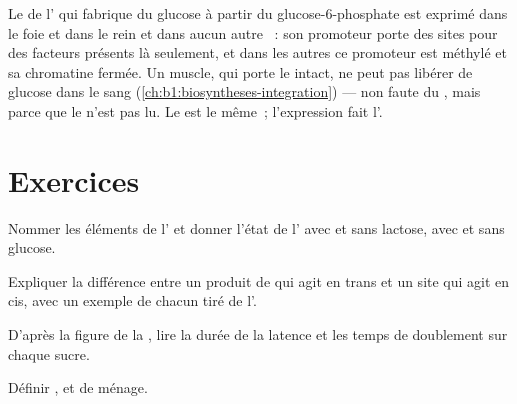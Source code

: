 \begin{example}\label{ex:b1:expression-control:twoorgans}
Le  de l' qui fabrique du glucose à partir du
glucose-6-phosphate est exprimé dans le foie et dans le rein et dans
aucun autre ~: son promoteur porte des sites pour des facteurs
présents là seulement, et dans les autres  ce promoteur est
méthylé et sa chromatine fermée. Un muscle, qui porte le  intact, ne
peut pas libérer de glucose dans le sang
(\cref{ch:b1:biosyntheses-integration}) --- non faute du , mais
parce que le  n'est pas lu. Le  est le même~; l'expression
fait l'.
\end{example}

\section{Exercices}

\begin{exercise}[$\star$]\label{exo:b1:expression-control:1}
Nommer les éléments de l' et donner l'état de l'
avec et sans lactose, avec et sans glucose.
\end{exercise}

\begin{exercise}[$\star$]\label{exo:b1:expression-control:2}
Expliquer la différence entre un produit de  qui agit en trans et un
site qui agit en cis, avec un exemple de chacun tiré de l'.
\end{exercise}

\begin{exercise}[$\star$]\label{exo:b1:expression-control:3}
D'après la figure de la , lire la durée de la latence et les
temps de doublement sur chaque sucre.
\end{exercise}

\begin{exercise}[$\star$]\label{exo:b1:expression-control:4}
Définir ,  et  de ménage.
\end{exercise}

